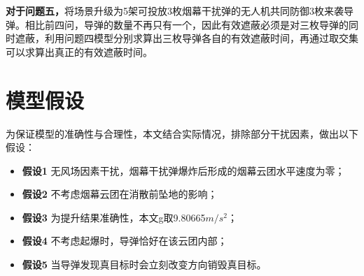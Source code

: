 \documentclass[withoutpreface,bwprint]{cumcmthesis}
\numberwithin{equation}{section} %
\numberwithin{figure}{section} %
\numberwithin{table}{section}  %
\begin{document}
\textbf{对于问题五，}将场景升级为5架可投放3枚烟幕干扰弹的无人机共同防御3枚来袭导弹。相比前四问，导弹的数量不再只有一个，因此有效遮蔽必须是对三枚导弹的同时遮蔽，利用问题四模型分别求算出三枚导弹各自的有效遮蔽时间，再通过取交集可以求算出真正的有效遮蔽时间。

\vspace{-0.5em}
\section{模型假设}

为保证模型的准确性与合理性，本文结合实际情况，排除部分干扰因素，做出以下假设：

\begin{itemize}[itemindent=2em]
\item \textbf{假设1} 无风场因素干扰，烟幕干扰弹爆炸后形成的烟幕云团水平速度为零；
\item \textbf{假设2} 不考虑烟幕云团在消散前坠地的影响；
\item \textbf{假设3} 为提升结果准确性，本文g取9.80665$m/s^2$；
\item \textbf{假设4} 不考虑起爆时，导弹恰好在该云团内部；
\item \textbf{假设5} 当导弹发现真目标时会立刻改变方向销毁真目标。
\end{itemize}

\vspace{-0.5em}
\end{document}
